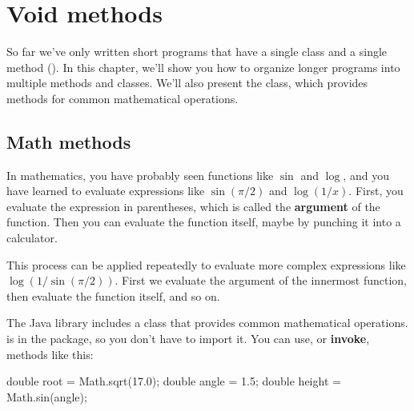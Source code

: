 \chapter{Void methods}
\label{voidmeth}

So far we've only written short programs that have a single class and a single method ().
In this chapter, we'll show you how to organize longer programs into multiple methods and classes.
We'll also present the  class, which provides methods for common mathematical operations.




\section{Math methods}


In mathematics, you have probably seen functions like $\sin$ and $\log$, and you have learned to evaluate expressions like $\sin(\pi/2)$ and $\log(1/x)$.
First, you evaluate the expression in parentheses, which is called the {\bf argument} of the function.
Then you can evaluate the function itself, maybe by punching it into a calculator.

This process can be applied repeatedly to evaluate more complex expressions like $\log(1/\sin(\pi/2))$.
First we evaluate the argument of the innermost function, then evaluate the function itself, and so on.


The Java library includes a  class that provides common mathematical operations.
 is in the  package, so you don't have to import it.
You can use, or {\bf invoke},  methods like this:

\begin{code}
double root = Math.sqrt(17.0);
double angle = 1.5;
double height = Math.sin(angle);
\end{code}

